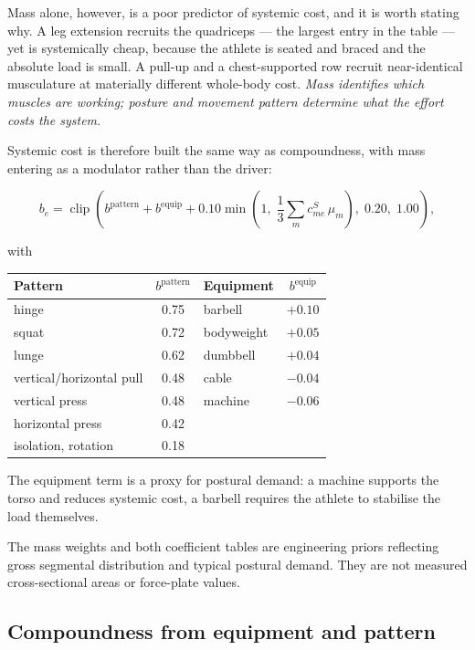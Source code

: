 \documentclass[11pt]{article}
\begin{document}
Mass alone, however, is a poor predictor of systemic cost, and it is worth stating why. A leg extension recruits the quadriceps --- the largest entry in the table --- yet is systemically cheap, because the athlete is seated and braced and the absolute load is small. A pull-up and a chest-supported row recruit near-identical musculature at materially different whole-body cost. \emph{Mass identifies which muscles are working; posture and movement pattern determine what the effort costs the system.}

Systemic cost is therefore built the same way as compoundness, with mass entering as a modulator rather than the driver:

\begin{equation}
b_e=\operatorname{clip}\left(
b^{\mathrm{pattern}}+b^{\mathrm{equip}}
+0.10\min\!\left(1,\;\frac{1}{3}\sum_m c^{S}_{me}\,\mu_m\right),
\;0.20,\;1.00\right),
\end{equation}

with

\begin{center}
\begin{tabular}{lclc}
\toprule
Pattern & $b^{\mathrm{pattern}}$ & Equipment & $b^{\mathrm{equip}}$ \\
\midrule
hinge & 0.75 & barbell & $+0.10$ \\
squat & 0.72 & bodyweight & $+0.05$ \\
lunge & 0.62 & dumbbell & $+0.04$ \\
vertical/horizontal pull & 0.48 & cable & $-0.04$ \\
vertical press & 0.48 & machine & $-0.06$ \\
horizontal press & 0.42 & & \\
isolation, rotation & 0.18 & & \\
\bottomrule
\end{tabular}
\end{center}

The equipment term is a proxy for postural demand: a machine supports the torso and reduces systemic cost, a barbell requires the athlete to stabilise the load themselves.

The mass weights and both coefficient tables are engineering priors reflecting gross segmental distribution and typical postural demand. They are not measured cross-sectional areas or force-plate values.

\subsection{Compoundness from equipment and pattern}
\end{document}
